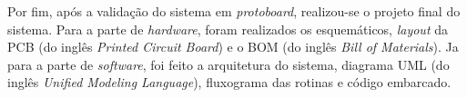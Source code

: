 Por fim, após a validação do sistema em \textit{protoboard}, realizou-se o projeto final do sistema. Para a parte de \textit{hardware}, foram realizados os esquemáticos, \textit{layout} da PCB (do inglês \textit{Printed Circuit Board}) e o BOM (do inglês \textit{Bill of Materials}). Ja para a parte de \textit{software}, foi feito a arquitetura do sistema, diagrama UML (do inglês \textit{Unified Modeling Language}), fluxograma das rotinas e código embarcado.

